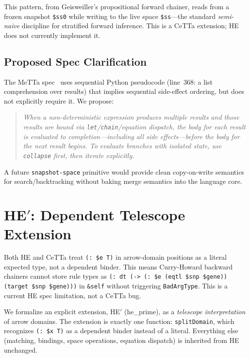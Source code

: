 \documentclass[11pt]{article}
\newcommand{\code}[1]{\texttt{#1}}
\newcommand{\HE}{\textup{HE}}
\newcommand{\CeTTa}{\textup{CeTTa}}
\begin{document}
This pattern, from Geisweiller's propositional forward chainer,
reads from a frozen snapshot \code{\$ss0} while writing to the
live space \code{\$ss}---the standard \emph{semi-naive} discipline
for stratified forward inference.  This is a \CeTTa{} extension;
\HE{} does not currently implement it.

\subsection{Proposed Spec Clarification}

The MeTTa spec~\cite{metta} uses sequential Python pseudocode
(line~368: a list comprehension over results) that implies
sequential side-effect ordering, but does not explicitly require
it.  We propose:

\begin{quote}
\emph{When a non-deterministic expression produces multiple results
and those results are bound via \code{let}/\code{chain}/equation
dispatch, the body for each result is evaluated to completion---including
all side effects---before the body for the next result begins.
To evaluate branches with isolated state, use \code{collapse}
first, then iterate explicitly.}
\end{quote}

A future \code{snapshot-space} primitive would provide clean
copy-on-write semantics for search/backtracking without baking
merge semantics into the language core.

\section{HE$'$: Dependent Telescope Extension}
\label{sec:heprime}

Both HE and \CeTTa{} treat \code{(: \$e T)} in arrow-domain positions as a
literal expected type, not a dependent binder.  This means Curry-Howard
backward chainers cannot store rule types as \code{(: dt (-> (: \$e
(eqtl \$snp \$gene)) (target \$snp \$gene)))} in \code{\&self} without
triggering \code{BadArgType}.  This is a current HE spec limitation, not
a \CeTTa{} bug.

We formalize an explicit extension, HE$'$ (he\_prime), as a
\emph{telescope interpretation} of arrow domains.  The extension is
exactly one function: \code{splitDomain}, which recognizes \code{(: \$x
T)} as a dependent binder instead of a literal.  Everything else
(matching, bindings, space operations, equation dispatch) is inherited
from HE unchanged.
\end{document}
